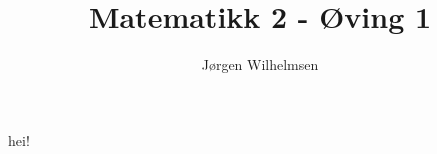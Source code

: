 \documentclass{article}
\date{}
\numberwithin{equation}{section}
\begin{document}
\title{Matematikk 2 - Øving 1}
\author{Jørgen Wilhelmsen}

\maketitle
\thispagestyle{fancy}

hei! 
\end{document}
